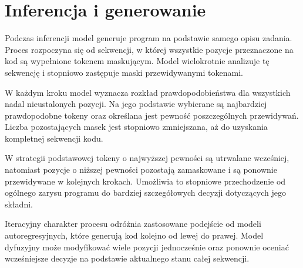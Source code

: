 
\section{Inferencja i generowanie}
\label{sec:inferencja}

Podczas inferencji model generuje program na podstawie samego opisu zadania. Proces rozpoczyna się od sekwencji, w której wszystkie pozycje przeznaczone na kod są wypełnione tokenem maskującym. Model wielokrotnie analizuje tę sekwencję i stopniowo zastępuje maski przewidywanymi tokenami.

W każdym kroku model wyznacza rozkład prawdopodobieństwa dla wszystkich nadal nieustalonych pozycji. Na jego podstawie wybierane są najbardziej prawdopodobne tokeny oraz określana jest pewność poszczególnych przewidywań. Liczba pozostających masek jest stopniowo zmniejszana, aż do uzyskania kompletnej sekwencji kodu.

W strategii podstawowej tokeny o najwyższej pewności są utrwalane wcześniej, natomiast pozycje o niższej pewności pozostają zamaskowane i są ponownie przewidywane w kolejnych krokach. Umożliwia to stopniowe przechodzenie od ogólnego zarysu programu do bardziej szczegółowych decyzji dotyczących jego składni.

Iteracyjny charakter procesu odróżnia zastosowane podejście od modeli autoregresyjnych, które generują kod kolejno od lewej do prawej. Model dyfuzyjny może modyfikować wiele pozycji jednocześnie oraz ponownie oceniać wcześniejsze decyzje na podstawie aktualnego stanu całej sekwencji.


